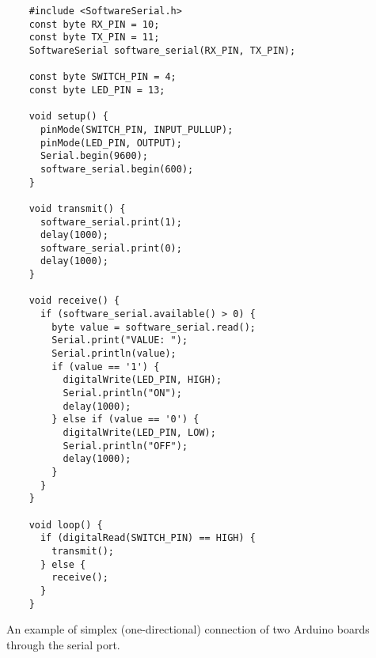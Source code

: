 \documentclass[../sparc.tex]{subfiles}
\begin{document}
\begin{listing}[H]
  \begin{verbatim}
    #include <SoftwareSerial.h>
    const byte RX_PIN = 10;
    const byte TX_PIN = 11;
    SoftwareSerial software_serial(RX_PIN, TX_PIN);

    const byte SWITCH_PIN = 4;
    const byte LED_PIN = 13;

    void setup() {
      pinMode(SWITCH_PIN, INPUT_PULLUP);
      pinMode(LED_PIN, OUTPUT);
      Serial.begin(9600);
      software_serial.begin(600);
    }

    void transmit() {
      software_serial.print(1);
      delay(1000);
      software_serial.print(0);
      delay(1000);
    }

    void receive() {
      if (software_serial.available() > 0) {
        byte value = software_serial.read();
        Serial.print("VALUE: ");
        Serial.println(value);
        if (value == '1') {
          digitalWrite(LED_PIN, HIGH);
          Serial.println("ON");
          delay(1000);
        } else if (value == '0') {
          digitalWrite(LED_PIN, LOW);
          Serial.println("OFF");
          delay(1000);
        }
      }
    }

    void loop() {
      if (digitalRead(SWITCH_PIN) == HIGH) {
        transmit();
      } else {
        receive();
      }
    }
  \end{verbatim}
  \label{listing:communication-serial-two-arduino-example}
  \caption{An example of simplex (one-directional) connection of two Arduino
    boards through the serial port.}
\end{listing}
\end{document}
